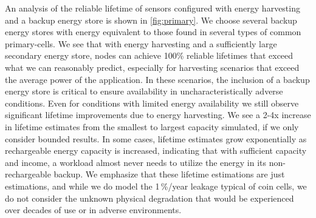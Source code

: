 An analysis of the reliable lifetime of sensors configured with energy
harvesting and a backup energy store is shown in \cref{fig:primary}.
We choose several backup energy
stores with energy equivalent to those found in several types of common
primary-cells. We see that with energy harvesting and a sufficiently
large secondary energy store, nodes can
achieve 100\% reliable lifetimes that exceed
what we can reasonably predict, especially for harvesting scenarios that
exceed the average power of the application. In these scenarios, 
the inclusion of a backup energy store is critical 
to ensure availability in uncharacteristically adverse conditions.
Even for conditions with
limited energy availability we still observe significant lifetime improvements
due to energy harvesting.
We see a 2-4x increase in lifetime estimates from the smallest to largest
capacity simulated, if we only consider bounded results.
In some cases, lifetime estimates grow exponentially as rechargeable energy capacity is increased, indicating that with sufficient capacity and income, a workload almost never needs to utilize the energy in its non-rechargeable backup.
We emphasize that
these lifetime estimations are
just estimations, and while we do model the 1\,\%/year leakage
typical of coin cells, we do not consider the unknown
physical degradation that would be experienced over decades of use or in adverse environments.



